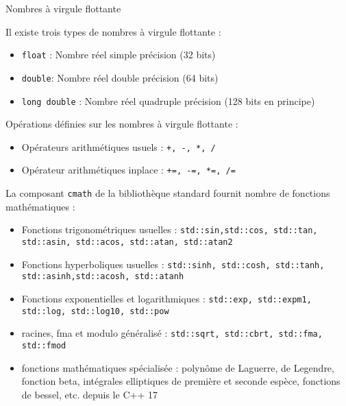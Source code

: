 \documentclass[compress,10pt,aspectratio=169]{beamer}
\begin{document}
\begin{frame}[fragile]{Nombres à virgule flottante}
\scriptsize

    Il existe trois types de nombres à virgule flottante :
    \begin{itemize} 
    \item \texttt{float} : Nombre réel simple précision (32 bits)
    \item \texttt{double}: Nombre réel double précision (64 bits)
    \item \texttt{long double} : Nombre réel quadruple précision (128 bits en principe)
    \end{itemize}

    Opérations définies sur les nombres à virgule flottante :
    \begin{itemize}
    \item Opérateurs arithmétiques usuels : \texttt{+, -, *, /}
    \item Opérateur arithmétiques inplace : \texttt{+=, -=, *=, /=}
    \end{itemize}

    La composant \texttt{cmath} de la bibliothèque standard fournit nombre de fonctions mathématiques :
    \begin{itemize}
    \item Fonctions trigonométriques usuelles : \texttt{std::sin,std::cos, std::tan, std::asin, std::acos, std::atan, std::atan2}
    \item Fonctions hyperboliques usuelles : \texttt{std::sinh, std::cosh, std::tanh, std::asinh,std::acosh, std::atanh}
    \item Fonctions exponentielles et logarithmiques : \texttt{std::exp, std::expm1, std::log, std::log10, std::pow}
    \item racines, fma et modulo généralisé : \texttt{std::sqrt, std::cbrt, std::fma, std::fmod}
    \item fonctions mathématiques spécialisée : polynôme de Laguerre, de Legendre, fonction beta, intégrales elliptiques de première et seconde espèce,
          fonctions de bessel, etc. depuis le C++ 17
    \end{itemize}
\end{frame}
\end{document}

